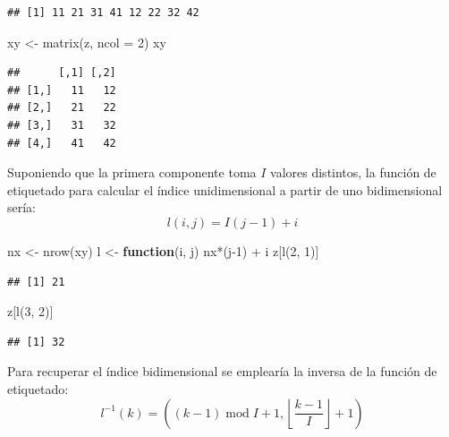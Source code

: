 \documentclass[
]{book}
\newenvironment{Shaded}{\begin{snugshade}}{\end{snugshade}}
\newcommand{\AttributeTok}[1]{\textcolor[rgb]{0.77,0.63,0.00}{#1}}
\newcommand{\ControlFlowTok}[1]{\textcolor[rgb]{0.13,0.29,0.53}{\textbf{#1}}}
\newcommand{\DecValTok}[1]{\textcolor[rgb]{0.00,0.00,0.81}{#1}}
\newcommand{\FunctionTok}[1]{\textcolor[rgb]{0.00,0.00,0.00}{#1}}
\newcommand{\NormalTok}[1]{#1}
\newcommand{\OtherTok}[1]{\textcolor[rgb]{0.56,0.35,0.01}{#1}}
\newcommand{\SpecialCharTok}[1]{\textcolor[rgb]{0.00,0.00,0.00}{#1}}
\theoremstyle{break}
\theoremstyle{nonumberplain}
\begin{document}
\begin{verbatim}
## [1] 11 21 31 41 12 22 32 42
\end{verbatim}

\begin{Shaded}
\begin{Highlighting}[]
\NormalTok{xy }\OtherTok{\textless{}{-}} \FunctionTok{matrix}\NormalTok{(z, }\AttributeTok{ncol =} \DecValTok{2}\NormalTok{)}
\NormalTok{xy}
\end{Highlighting}
\end{Shaded}

\begin{verbatim}
##      [,1] [,2]
## [1,]   11   12
## [2,]   21   22
## [3,]   31   32
## [4,]   41   42
\end{verbatim}

Suponiendo que la primera componente toma \(I\) valores distintos, la función de etiquetado para calcular el índice unidimensional a partir de uno bidimensional sería:
\[l(i, j) = I(j-1) + i\]

\begin{Shaded}
\begin{Highlighting}[]
\NormalTok{nx }\OtherTok{\textless{}{-}} \FunctionTok{nrow}\NormalTok{(xy)}
\NormalTok{l }\OtherTok{\textless{}{-}} \ControlFlowTok{function}\NormalTok{(i, j) nx}\SpecialCharTok{*}\NormalTok{(j}\DecValTok{{-}1}\NormalTok{) }\SpecialCharTok{+}\NormalTok{ i}
\NormalTok{z[}\FunctionTok{l}\NormalTok{(}\DecValTok{2}\NormalTok{, }\DecValTok{1}\NormalTok{)]}
\end{Highlighting}
\end{Shaded}

\begin{verbatim}
## [1] 21
\end{verbatim}

\begin{Shaded}
\begin{Highlighting}[]
\NormalTok{z[}\FunctionTok{l}\NormalTok{(}\DecValTok{3}\NormalTok{, }\DecValTok{2}\NormalTok{)]}
\end{Highlighting}
\end{Shaded}

\begin{verbatim}
## [1] 32
\end{verbatim}

Para recuperar el índice bidimensional se emplearía la inversa de la función de etiquetado:
\[l^{-1}( k )  =\left(  (k -1) \operatorname{mod} I  + 1, \left\lfloor \frac{k - 1}{I}\right\rfloor + 1\right)\]
\end{document}
